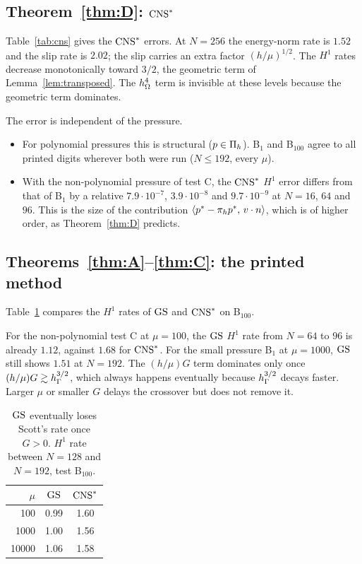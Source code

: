 \subsection{Theorem~\ref{thm:D}: $\mathrm{CNS}^\ast$}
Table~\ref{tab:cns} gives the $\mathrm{CNS}^\ast$ errors. At $N=256$ the energy-norm rate is $1.52$ and the slip rate is $2.02$; the slip carries an extra factor $(h/\mu)^{1/2}$. The $H^1$ rates decrease monotonically toward $3/2$, the geometric term of Lemma~\ref{lem:transposed}. The $h_\Omega^4$ term is invisible at these levels because the geometric term dominates.

The error is independent of the pressure.
\begin{itemize}
\item For polynomial pressures this is structural ($p\in\Pi_h$). B$_1$ and B$_{100}$ agree to all printed digits wherever both were run ($N\le192$, every $\mu$).
\item With the non-polynomial pressure of test C, the $\mathrm{CNS}^\ast$ $H^1$ error differs from that of B$_1$ by a relative $7.9\cdot10^{-7}$, $3.9\cdot10^{-8}$ and $9.7\cdot10^{-9}$ at $N=16$, $64$ and $96$. This is the size of the contribution $\langle p^\ast-\pi_hp^\ast,\, v\cdot n\rangle$, which is of higher order, as Theorem~\ref{thm:D} predicts.
\end{itemize}

\subsection{Theorems~\ref{thm:A}--\ref{thm:C}: the printed method}
Table~\ref{tab:gs} compares the $H^1$ rates of $\mathrm{GS}$ and $\mathrm{CNS}^\ast$ on B$_{100}$.

For the non-polynomial test C at $\mu=100$, the $\mathrm{GS}$ $H^1$ rate from $N=64$ to $96$ is already $1.12$, against $1.68$ for $\mathrm{CNS}^\ast$. For the small pressure B$_1$ at $\mu=1000$, $\mathrm{GS}$ still shows $1.51$ at $N=192$. The $(h/\mu)G$ term dominates only once $(h/\mu)G\gtrsim h_\Gamma^{3/2}$, which always happens eventually because $h_\Gamma^{3/2}$ decays faster. Larger $\mu$ or smaller $G$ delays the crossover but does not remove it.

\begin{table}[t]
\centering
\caption{$\mathrm{GS}$ eventually loses Scott's rate once $G>0$. $H^1$ rate between $N=128$ and $N=192$, test B$_{100}$.}\label{tab:gs}
\begin{tabular}{rcc}
\toprule
$\mu$ & $\mathrm{GS}$ & $\mathrm{CNS}^\ast$\\
\midrule
100 & 0.99 & 1.60\\
1000 & 1.00 & 1.56\\
10000 & 1.06 & 1.58\\
\bottomrule
\end{tabular}
\end{table}

